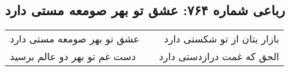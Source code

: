 \begin{center}
\section*{رباعی شماره ۷۶۴: عشق تو بهر صومعه مستی دارد}
\label{sec:0764}
\begin{longtable}{l p{0.5cm} r}
عشق تو بهر صومعه مستی دارد
&&
بازار بتان از تو شکستی دارد
\\
دست غم تو بهر دو عالم برسید
&&
الحق که غمت درازدستی دارد
\\
\end{longtable}
\end{center}
